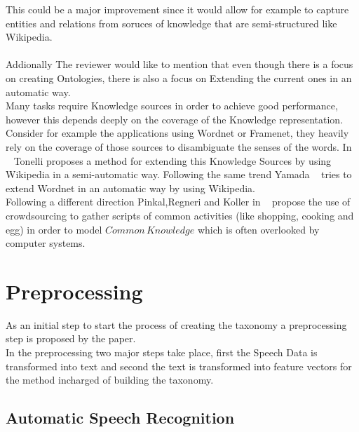 \documentclass[4pt,a4paper,twocolumn]{article}
\begin{document}
This could be a major improvement since it would allow for example to capture entities and relations from soruces of knowledge that are semi-structured like Wikipedia.\\
\\
Addionally The reviewer would like to mention that even though there is a focus on creating Ontologies, there is also a focus on Extending the current ones in an automatic way.\\
Many tasks require Knowledge sources in order to achieve good performance, however this depends deeply on the coverage of the Knowledge representation. 
Consider for example the applications using Wordnet or Framenet, they heavily rely on the coverage of those sources to disambiguate the senses of the words.
In ~\cite{Tonelli:2013:WWM:2405838.2405917} Tonelli proposes a method for extending this Knowledge Sources by using Wikipedia in a semi-automatic way.
Following the same trend Yamada ~\cite{yamada-EtAl:2011:IJCNLP-2011} tries to extend Wordnet in an automatic way by using Wikipedia.\\
Following a different direction Pinkal,Regneri and Koller  in ~\cite{regneri-koller-pinkal:2010:ACL} propose the use of crowdsourcing to gather scripts of common activities (like shopping, cooking and egg) in order to model $Common\, Knowledge$ which is often overlooked by computer systems.


\section{Preprocessing }
As an initial step to start the process of creating the taxonomy a preprocessing step is proposed by the paper.\\
In the preprocessing two major steps take place, first the Speech Data is transformed into text and second the text is transformed into feature vectors for the method incharged of building the taxonomy.


\subsection{Automatic Speech Recognition}
		
\end{document}
